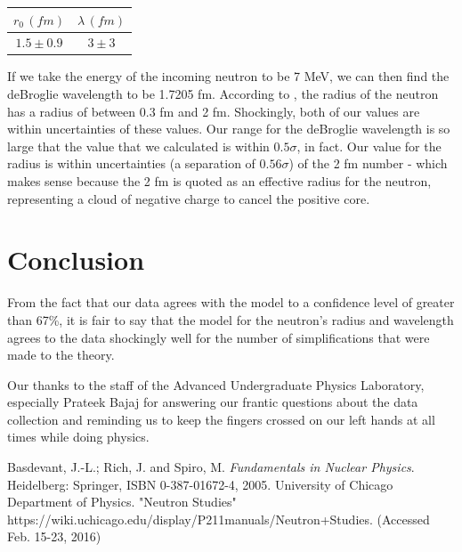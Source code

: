 \documentclass{article}
\begin{document}
  \begin{center}
    \begin{tabular}{|c|c|} \hline
      $r_0\,(fm)$ & $\lambda\,(fm)$ \\ \hline
      $1.5 \pm 0.9$ & $3 \pm 3$ \\ \hline
    \end{tabular}
  \end{center}

  If we take the energy of the incoming neutron to be 7 MeV, we can then find the deBroglie wavelength to be 1.7205 fm.  According to \cite{rad_n}, the radius of the neutron has a radius of between 0.3 fm and 2 fm.  Shockingly, both of our values are within uncertainties of these values.  Our range for the deBroglie wavelength is so large that the value that we calculated is within $0.5\sigma$, in fact.  Our value for the radius is within uncertainties (a separation of $0.56\sigma$) of the 2 fm number - which makes sense because the 2 fm is quoted as an effective radius for the neutron, representing a cloud of negative charge to cancel the positive core.

\section{Conclusion}
  From the fact that our data agrees with the model to a confidence level of greater than 67\%, it is fair to say that the model for the neutron's radius and wavelength agrees to the data shockingly well for the number of simplifications that were made to the theory.

  \hspace{.25cm}

  Our thanks to the staff of the Advanced Undergraduate Physics Laboratory, especially Prateek Bajaj for answering our frantic questions about the data collection and reminding us to keep the fingers crossed on our left hands at all times while doing physics.

\begin{thebibliography}{2}
    Basdevant, J.-L.; Rich, J. and Spiro, M. \emph{Fundamentals in Nuclear Physics}. Heidelberg: Springer, ISBN 0-387-01672-4, 2005.
  	University of Chicago Department of Physics. "Neutron Studies"  https://wiki.uchicago.edu/display/P211manuals/Neutron+Studies. (Accessed Feb. 15-23, 2016)
\end{thebibliography}
\end{document}

